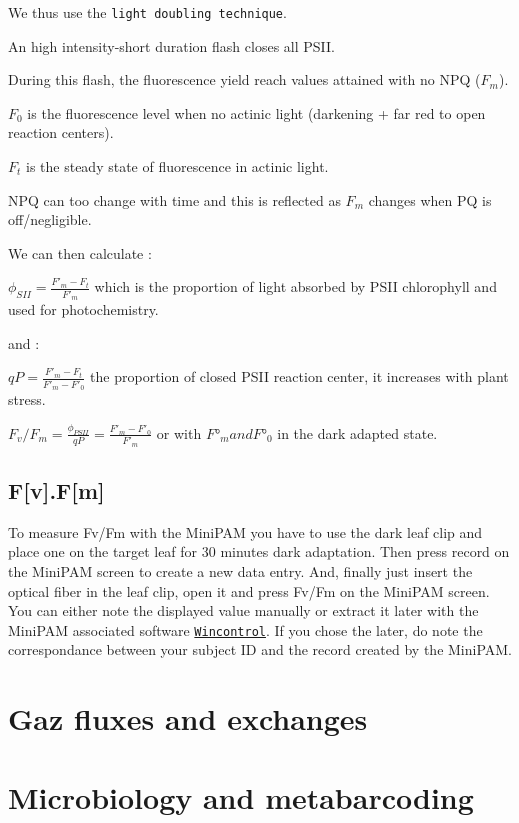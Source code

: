 \documentclass[
  12pt,
  american,
  a4paper,
  extrafontsizes,onecolumn,openright
  ]{memoir}
\begin{document}
We thus use the \texttt{light\ doubling\ technique}.

An high intensity-short duration flash closes all PSII.

During this flash, the fluorescence yield reach values attained with no NPQ (\(F_m\)).

\(F_0\) is the fluorescence level when no actinic light (darkening + far red to open reaction centers).

\(F_t\) is the steady state of fluorescence in actinic light.

NPQ can too change with time and this is reflected as \(F_m\) changes when PQ is off/negligible.

We can then calculate :

\(\phi _{SII} = \frac{F'_m-F_t}{F'_m}\) which is the proportion of light absorbed by PSII chlorophyll and used for photochemistry.

and :

\(qP = \frac{F'_m-F_t}{F'_m-F'_0}\) the proportion of closed PSII reaction center, it increases with plant stress.

\(F_v/F_m=\frac{\phi _{PSII}}{qP}=\frac{F'_m-F'_0}{F'_m}\) or with \(F°_m and F°_0\) in the dark adapted state.

\hypertarget{fv.fm}{%
\section{F{[}v{]}.F{[}m{]}}\label{fv.fm}}

To measure Fv/Fm with the MiniPAM you have to use the dark leaf clip and place one on the target leaf for 30 minutes dark adaptation.
Then press record on the MiniPAM screen to create a new data entry.
And, finally just insert the optical fiber in the leaf clip, open it and press Fv/Fm on the MiniPAM screen.
You can either note the displayed value manually or extract it later with the MiniPAM associated software \href{https://www.walz.com/products/chl_p700/mini-pam-II/downloads.html}{\texttt{Wincontrol}}.
If you chose the later, do note the correspondance between your subject ID and the record created by the MiniPAM.

\hypertarget{gaz-fluxes-and-exchanges}{%
\chapter{Gaz fluxes and exchanges}\label{gaz-fluxes-and-exchanges}}

\hypertarget{microbiology-and-metabarcoding}{%
\chapter{Microbiology and metabarcoding}\label{microbiology-and-metabarcoding}}
\end{document}
